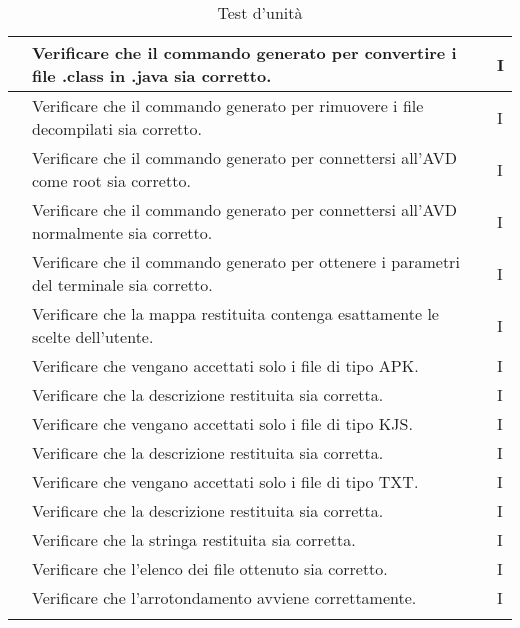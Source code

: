 \begin{center}
\begin{longtable}{ |C{3cm} | C{8.5cm}| C{1.5cm} |}
         & Verificare che il commando generato per convertire i file .class in .java sia corretto.
        & I \\\hline
         & Verificare che il commando generato per rimuovere i file decompilati sia corretto.
        & I \\\hline
         & Verificare che il commando generato per connettersi all'AVD come root sia corretto.
        & I \\\hline
         & Verificare che il commando generato per connettersi all'AVD normalmente sia corretto.
        & I \\\hline
         & Verificare che il commando generato per ottenere i parametri del terminale sia corretto.
        & I \\\hline
         & Verificare che la mappa restituita contenga esattamente le scelte dell'utente.
        & I \\\hline
         & Verificare che vengano accettati solo i file di tipo APK.
        & I \\\hline
         & Verificare che la descrizione restituita sia corretta.
        & I \\\hline
         & Verificare che vengano accettati solo i file di tipo KJS.
        & I \\\hline
         & Verificare che la descrizione restituita sia corretta.
        & I \\\hline
         & Verificare che vengano accettati solo i file di tipo TXT.
        & I \\\hline
         & Verificare che la descrizione restituita sia corretta.
        & I \\\hline
         & Verificare che la stringa restituita sia corretta.
        & I \\\hline
         & Verificare che l'elenco dei file ottenuto sia corretto.
        & I \\\hline
         & Verificare che l'arrotondamento avviene correttamente.
        & I \\\hline
        \caption{Test d'unità}
    \end{longtable}
\end{center}
\setcounter{rowcount}{0}

